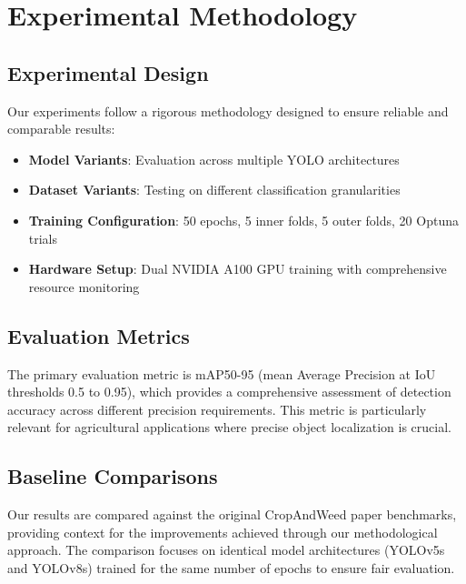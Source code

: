 \section{Experimental Methodology}
\subsection{Experimental Design}

Our experiments follow a rigorous methodology designed to ensure reliable and comparable results:

\begin{itemize}
    \item \textbf{Model Variants}: Evaluation across multiple YOLO architectures
    \item \textbf{Dataset Variants}: Testing on different classification granularities
    \item \textbf{Training Configuration}: 50 epochs, 5 inner folds, 5 outer folds, 20 Optuna trials
    \item \textbf{Hardware Setup}: Dual NVIDIA A100 GPU training with comprehensive resource monitoring
\end{itemize}

\subsection{Evaluation Metrics}

The primary evaluation metric is mAP50-95 (mean Average Precision at IoU thresholds 0.5 to 0.95), which provides a comprehensive assessment of detection accuracy across different precision requirements. This metric is particularly relevant for agricultural applications where precise object localization is crucial.

\subsection{Baseline Comparisons}

Our results are compared against the original CropAndWeed paper benchmarks, providing context for the improvements achieved through our methodological approach. The comparison focuses on identical model architectures (YOLOv5s and YOLOv8s) trained for the same number of epochs to ensure fair evaluation.
